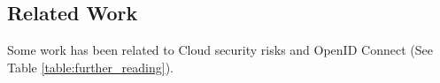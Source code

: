 \begin{itemize}

\section{Related Work}

Some work has been related to Cloud security risks and OpenID Connect (See Table \ref{table:further_reading}).  




\end{itemize}
